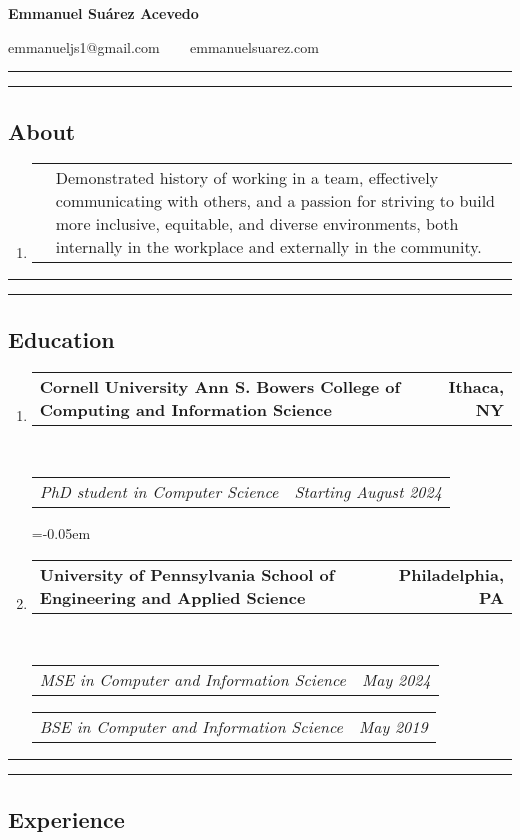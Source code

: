 \documentclass[letterpaper]{article}
\makeatletter
\newcommand*{\tabulardef}[3]{\begin{tabular}[t]{@{}lp{\dimexpr\linewidth-#1}@{}}
    #2&#3
\end{tabular}}
\newcommand{\headerrow}[2]
{\begin{tabular*}{\linewidth}{l@{\extracolsep{\fill}}r}
	#1 &
	#2 \\
\end{tabular*}}
\makeatother
\begin{document}
\begin{center}
{\LARGE \textbf{Emmanuel Suárez Acevedo}}

emmanueljs1@gmail.com \ \textbullet
\ \ emmanuelsuarez.com \\
\end{center}

\hrule
\hrule
\vspace{-0.6em}
\subsection*{About}
\begin{enumerate}[label=]
    \item\tabulardef{1cm}{}{Demonstrated history of working in a team,
          effectively communicating with others, and a passion
          for striving to build more inclusive, equitable, and
          diverse environments, both internally in the workplace and
          externally in the community.}
\end{enumerate}

\hrule
\hrule
\vspace{-0.6em}
\subsection*{Education}

\begin{enumerate}[label=]
	\parskip=-0.05em
	\item 
	\headerrow
		{\textbf{Cornell University Ann S. Bowers College of Computing and Information Science }}
		{\textbf{Ithaca, NY}}
	\\
	\headerrow
		{\emph{PhD student in Computer Science}}
		{\emph{Starting August 2024}}

	\parskip=-0.05em
	\item 
	\headerrow
		{\textbf{University of Pennsylvania School of Engineering and Applied Science}}
		{\textbf{Philadelphia, PA}}
	\\
	\headerrow
		{\emph{MSE in Computer and Information Science}}
		{\emph{May 2024}}
	\headerrow
		{\emph{BSE in Computer and Information Science}}
		{\emph{May 2019}}

\end{enumerate}

\hrule\hrule
\vspace{-0.6em}
\subsection*{Experience}
\end{document}
